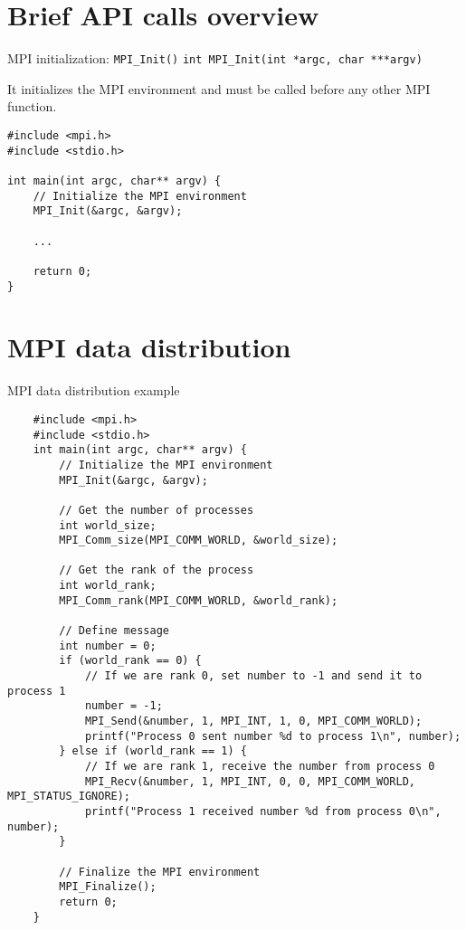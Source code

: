 \documentclass{beamer}
\begin{document}
\section{Brief API calls overview}

\begin{frame}[fragile]{MPI initialization: \texttt{MPI\_Init()}}
  \texttt{int MPI\_Init(int *argc, char ***argv)}

  It initializes the MPI environment and must be called before any other MPI function.

  \lstset{style=CStyle, caption=Basic application written using MPI}
  \begin{lstlisting}
#include <mpi.h>
#include <stdio.h>

int main(int argc, char** argv) {
    // Initialize the MPI environment
    MPI_Init(&argc, &argv);

    ...

    return 0;
}
  \end{lstlisting}

\end{frame}

\section{MPI data distribution}

\begin{frame}[fragile]{MPI data distribution example}
  \lstset{style=CStyle, caption=MPI data distribution example}
  \begin{lstlisting}
    #include <mpi.h>
    #include <stdio.h>
    int main(int argc, char** argv) {
        // Initialize the MPI environment
        MPI_Init(&argc, &argv);
    
        // Get the number of processes
        int world_size;
        MPI_Comm_size(MPI_COMM_WORLD, &world_size);
    
        // Get the rank of the process
        int world_rank;
        MPI_Comm_rank(MPI_COMM_WORLD, &world_rank);
    
        // Define message
        int number = 0;
        if (world_rank == 0) {
            // If we are rank 0, set number to -1 and send it to process 1
            number = -1;
            MPI_Send(&number, 1, MPI_INT, 1, 0, MPI_COMM_WORLD);
            printf("Process 0 sent number %d to process 1\n", number);
        } else if (world_rank == 1) {
            // If we are rank 1, receive the number from process 0
            MPI_Recv(&number, 1, MPI_INT, 0, 0, MPI_COMM_WORLD, MPI_STATUS_IGNORE);
            printf("Process 1 received number %d from process 0\n", number);
        }
    
        // Finalize the MPI environment
        MPI_Finalize();
        return 0;
    }
  \end{lstlisting}

\end{frame}
\end{document}
